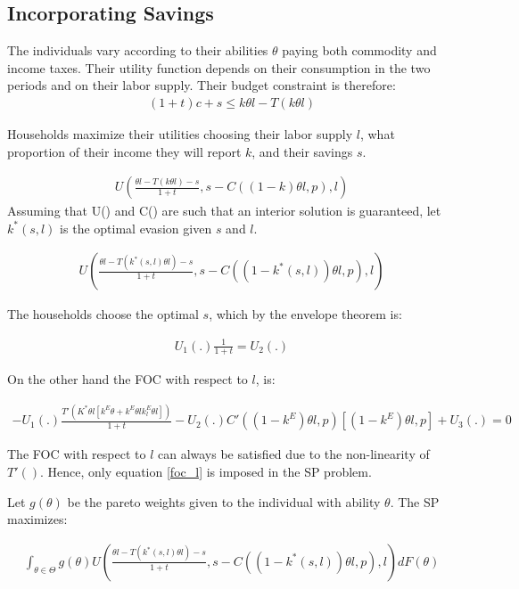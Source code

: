 \subsection{Incorporating Savings}

\par The individuals vary according to their abilities $\theta$ paying both commodity and income taxes. Their utility function depends on their consumption in the two periods and on their labor supply. Their budget constraint is therefore:
\begin{align}
    (1+t)c+s \leq k\theta l- T(k\theta l)
\end{align}
\par Households maximize their utilities choosing their labor supply $l$, what proportion of their income they will report $k$, and their savings $s$. 

\begin{align}
    U\left(\frac{\theta l-T(k\theta l)-s}{1+t}, s-C((1-k)\theta l,p),l\right)
\end{align}
Assuming that U() and C() are such that an interior solution is guaranteed, let $k^*(s,l)$ is the optimal evasion given $s$ and $l$. 

\begin{align}
    U\left(\frac{\theta l-T(k^*(s,l)\theta l)-s}{1+t}, s-C((1-k^*(s,l))\theta l,p),l\right)
\end{align}

The households choose the optimal $s$, which by the envelope theorem is:

\begin{align}
    U_1(.)\frac{1}{1+t}=U_2(.)
    \label{foc_l}
\end{align}

On the other hand the FOC with respect to $l$, is:

\begin{align}
    -U_1(.)\frac{T'(K^*\theta l[k^E \theta +k^E \theta l k^E_l \theta l])}{1+t}-U_2(.)C'((1-k^E)\theta l,p)[(1-k^E)\theta l,p]+U_3(.)=0
\end{align}

The FOC with respect to $l$ can always be satisfied due to the non-linearity of $T'()$. Hence, only equation \ref{foc_l} is imposed in the SP problem.

Let $g(\theta)$ be the pareto weights given to the individual with ability $\theta$. The SP maximizes:

\begin{align}
    \int_{\theta \in \Theta}  g(\theta) U\left(\frac{\theta l-T(k^*(s,l)\theta l)-s}{1+t}, s-C((1-k^*(s,l))\theta l,p),l\right) dF(\theta)
\end{align}

